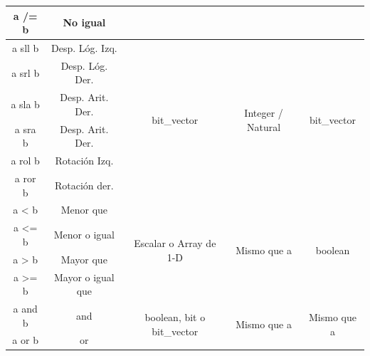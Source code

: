 \begin{table}[H]
\begin{tabular}{|c|c|c|c|c|}
		\cline{1-2}
		a /= b   & No igual          &                                             &                                    &                                    \\
		\hline
		a sll b  & Desp. Lóg. Izq.   & \multirow{6}{*}{bit\_vector}                & \multirow{6}{*}{Integer / Natural} & \multirow{6}{*}{bit\_vector}       \\
		\cline{1-2}
		a srl b  & Desp. Lóg. Der.   &                                             &                                    &                                    \\
		\cline{1-2}
		a sla b  & Desp. Arit. Der.  &                                             &                                    &                                    \\
		\cline{1-2}
		a sra b  & Desp. Arit. Der.  &                                             &                                    &                                    \\
		\cline{1-2}
		a rol b  & Rotación Izq.     &                                             &                                    &                                    \\
		\cline{1-2}
		a ror b  & Rotación der.     &                                             &                                    &                                    \\
		\hline
		a < b    & Menor que         & \multirow{4}{*}{Escalar o Array de 1-D}     & \multirow{4}{*}{Mismo que a}       & \multirow{4}{*}{boolean}           \\
		\cline{1-2}
		a <= b   & Menor o igual     &                                             &                                    &                                    \\
		\cline{1-2}
		a > b    & Mayor que         &                                             &                                    &                                    \\
		\cline{1-2}
		a >= b   & Mayor o igual que &                                             &                                    &                                    \\
		\hline
		a and b  & and               & \multirow{6}{*}{boolean, bit o bit\_vector} & \multirow{6}{*}{Mismo que a}       & \multirow{6}{*}{Mismo que a}       \\
		\cline{1-2}
		a or b   & or                &                                             &                                    &                                    \\

\end{tabular}
\end{table}
